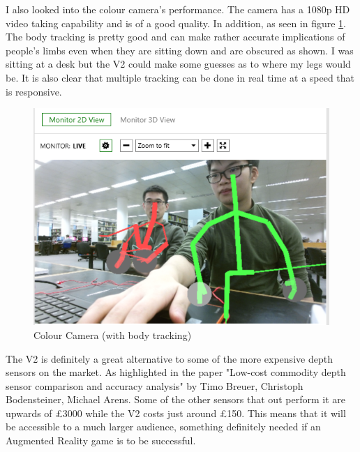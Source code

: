 \documentclass[11pt]{article}
\begin{document}
I also looked into the colour camera's performance. The camera has a 1080p HD
video taking capability and is of a good quality. In addition, as seen in 
figure \ref{KinectColour}. The body tracking is pretty good and can make rather
accurate implications of people's limbs even when they are sitting down and are
obscured as shown. I was sitting at a desk but the V2 could make some guesses
as to where my legs would be. It is also clear that multiple tracking can be done
in real time at a speed that is responsive.
\begin{center}
	\begin{figure}[H]
		\begin{center}
			\includegraphics[scale=0.5]{pics/KinectColor}
				\caption{Colour Camera (with body tracking)}
				\label{KinectColour}
		\end{center}
	\end{figure}
\end{center}

The V2 is definitely a great alternative to some of the more expensive depth 
sensors on the market. As highlighted in the paper
"Low-cost commodity depth sensor comparison and accuracy analysis" by
Timo Breuer, Christoph Bodensteiner, Michael Arens. Some of the other sensors
that out perform it are upwards of £3000 while the V2 costs just around £150.
This means that it will be accessible to a much larger audience, something
definitely needed if an Augmented Reality game is to be successful.\\ 
\\
\end{document}
